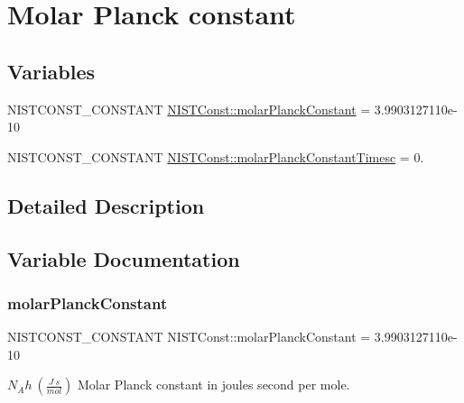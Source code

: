 \hypertarget{group___n_i_s_t_const-_molar_planck_constant}{}\section{Molar Planck constant}
\label{group___n_i_s_t_const-_molar_planck_constant}
\subsection*{Variables}
\begin{DoxyCompactItemize}
\item 
N\+I\+S\+T\+C\+O\+N\+S\+T\+\_\+\+C\+O\+N\+S\+T\+A\+NT \mbox{\hyperlink{group___n_i_s_t_const-_molar_planck_constant_ga5fc2f65abda1ed9e9431157c44da077a}{N\+I\+S\+T\+Const\+::molar\+Planck\+Constant}} = 3.\+9903127110e-\/10
\item 
N\+I\+S\+T\+C\+O\+N\+S\+T\+\_\+\+C\+O\+N\+S\+T\+A\+NT \mbox{\hyperlink{group___n_i_s_t_const-_molar_planck_constant_ga79708a6d196bdd250c5e965eb857a786}{N\+I\+S\+T\+Const\+::molar\+Planck\+Constant\+Timesc}} = 0.
\end{DoxyCompactItemize}


\subsection{Detailed Description}


\subsection{Variable Documentation}
\mbox{\label{group___n_i_s_t_const-_molar_planck_constant_ga5fc2f65abda1ed9e9431157c44da077a}} 
\subsubsection{\texorpdfstring{molar\+Planck\+Constant}{molarPlanckConstant}}
{\footnotesize\ttfamily N\+I\+S\+T\+C\+O\+N\+S\+T\+\_\+\+C\+O\+N\+S\+T\+A\+NT N\+I\+S\+T\+Const\+::molar\+Planck\+Constant = 3.\+9903127110e-\/10}

$N_A h \ (\frac{J\ s}{mol})$ Molar Planck constant in joules second per mole. \mbox{\label{group___n_i_s_t_const-_molar_planck_constant_ga79708a6d196bdd250c5e965eb857a786}} 
